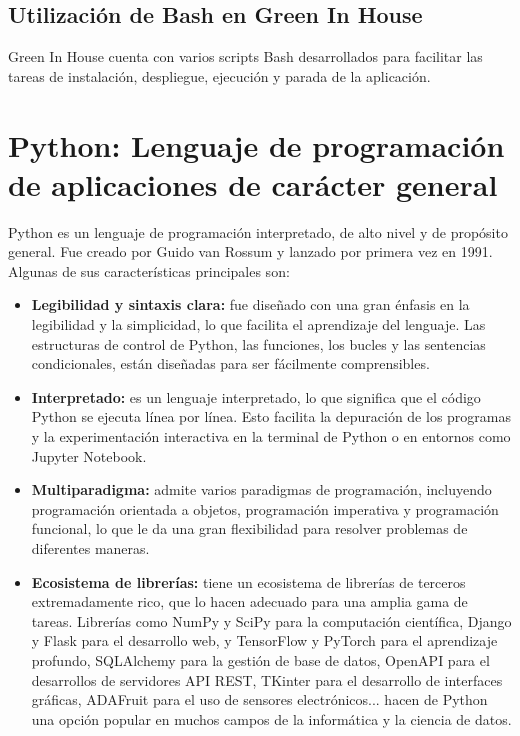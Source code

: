 \subsection{Utilización de Bash en Green In House}
Green In House cuenta con varios scripts Bash desarrollados para facilitar las tareas de instalación, despliegue, ejecución y parada de la aplicación.

\section{Python: Lenguaje de programación de aplicaciones de carácter general}
Python \cite{wiki:python} es un lenguaje de programación interpretado, de alto nivel y de propósito general. Fue creado por Guido van Rossum y lanzado por primera vez en 1991. Algunas de sus características principales son:
\begin{itemize}
    \item \textbf{Legibilidad y sintaxis clara:} fue diseñado con una gran énfasis en la legibilidad y la simplicidad, lo que facilita el aprendizaje del lenguaje. Las estructuras de control de Python, las funciones, los bucles y las sentencias condicionales, están diseñadas para ser fácilmente comprensibles.  
    \item \textbf{Interpretado:} es un lenguaje interpretado, lo que significa que el código Python se ejecuta línea por línea. Esto facilita la depuración de los programas y la experimentación interactiva en la terminal de Python o en entornos como Jupyter Notebook.   
    \item \textbf{Multiparadigma:} admite varios paradigmas de programación, incluyendo programación orientada a objetos, programación imperativa y programación funcional, lo que le da una gran flexibilidad para resolver problemas de diferentes maneras.  
    \item \textbf{Ecosistema de librerías:} tiene un ecosistema de librerías de terceros extremadamente rico, que lo hacen adecuado para una amplia gama de tareas. Librerías como NumPy y SciPy para la computación científica, Django y Flask para el desarrollo web, y TensorFlow y PyTorch para el aprendizaje profundo, SQLAlchemy para la gestión de base de datos, OpenAPI para el desarrollos de servidores API REST, TKinter para el desarrollo de interfaces gráficas, ADAFruit para el uso de sensores electrónicos... hacen de Python una opción popular en muchos campos de la informática y la ciencia de datos.
\end{itemize}
